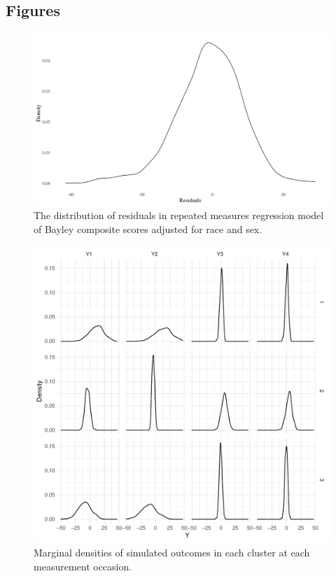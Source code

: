 \documentclass{article}
\begin{document}
\newpage
\subsection*{Figures}

\begin{figure}[h]
	\label{fig:skew_resids}
	\caption{The distribution of residuals in repeated measures regression model of Bayley composite scores adjusted for race and sex.}
	\centering
	\includegraphics[width = 1\textwidth]{bayley_resids_plot}
\end{figure}

\begin{figure}[h]
	\label{fig:sim1_dens}
	\caption{Marginal densities of simulated outcomes in each cluster at each measurement occasion.}
	\centering
	\includegraphics[width = 1\textwidth]{y_densities.pdf}
\end{figure}	
\end{document}
